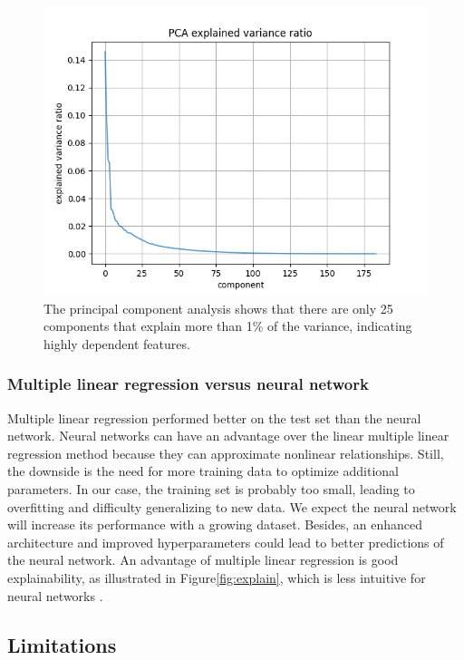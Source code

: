 \documentclass[conference]{IEEEtran}
\begin{document}
\begin{figure}[htbp]
\begin{center}
\includegraphics[width=1\linewidth]{figs/pca_explained_variance_ratio.png}
\caption{The principal component analysis shows that there are only 25 components that explain more than 1\% of the variance, indicating highly dependent features.}
\label{fig:pca}
\end{center}
\end{figure}


\subsubsection{Multiple linear regression versus neural network}
Multiple linear regression performed better on the test set than the neural network. Neural networks can have an advantage over the linear multiple linear regression method because they can approximate nonlinear relationships. Still, the downside is the need for more training data to optimize additional parameters. In our case, the training set is probably too small, leading to overfitting and difficulty generalizing to new data. We expect the neural network will increase its performance with a growing dataset.
Besides, an enhanced architecture and improved hyperparameters could lead to better predictions of the neural network.
An advantage of multiple linear regression is good explainability, as illustrated in Figure\ref{fig:explain}, which is less intuitive for neural networks \cite{samek_explainable_2017}.




\subsection{Limitations}
\end{document}
